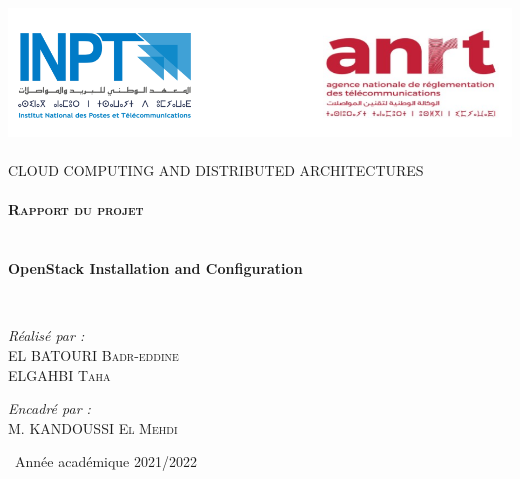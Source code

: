 \begin{titlepage}
\begin{center}

\includegraphics[width=1\textwidth]{./INPT+ANRT}~\\[1.5cm]

\textsc{\Large CLOUD COMPUTING AND DISTRIBUTED ARCHITECTURES }\\[2.5cm]

\textsc{\Large }\\[0.4cm]

\textsc{\LARGE \textbf{Rapport du projet}}\\[0.3cm]



\HRule \\[0.5cm]


\vspace{.5cm}
{\huge \bfseries \\ OpenStack Installation and Configuration \\[0.7cm] }

\HRule \\[1.5cm]
\vspace{1.2cm}

\begin{minipage}{0.4\textwidth}
\begin{flushleft} \large
\emph{Réalisé par :}\\[0.5 cm]
EL BATOURI  \textsc{ Badr-eddine}\\
ELGAHBI  \textsc{ Taha}\\

\end{flushleft}
\end{minipage}
\begin{minipage}{0.4\textwidth}
\begin{flushright} \large
\emph{Encadré par :} \\[0.5 cm]
M. KANDOUSSI \textsc{El Mehdi}\\

\end{flushright}
\end{minipage}



\vfill


{\large \ Année académique 2021/2022}

\end{center}
\end{titlepage}